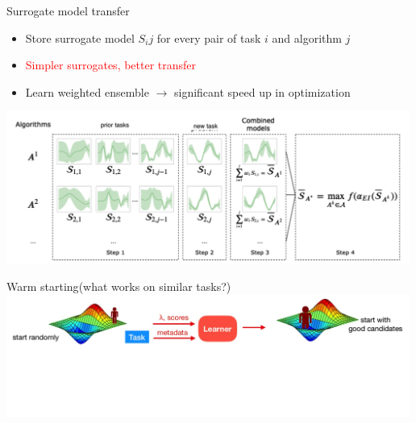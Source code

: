 \documentclass[aspectratio=169,t,handout,xcolor={usenames,dvipsnames}]{beamer}
\begin{document}
\begin{frame}{Surrogate model transfer}
    \begin{itemize}
        \item Store surrogate model $S_ij$ for every pair of task $i$ and algorithm $j$
        \item \textcolor{red}{Simpler surrogates, better transfer}
        \item Learn weighted ensemble $\rightarrow $ significant speed up in optimization
    \end{itemize}
\centering\includegraphics[height=5cm]{image/Jietu20220328-203139.jpg}

\end{frame}
\begin{frame}{Warm starting}{(what works on similar tasks?)}
    \centering\includegraphics[height=4cm]{image/Jietu20220328-203410.jpg}
\end{frame}
\end{document}
